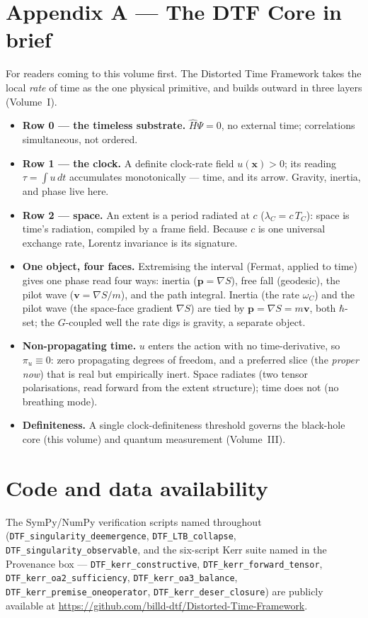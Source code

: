 \documentclass[11pt]{article}
\begin{document}
\appendix
\section*{Appendix A --- The DTF Core in brief}
\noindent For readers coming to this volume first. The Distorted Time Framework takes the local
\emph{rate} of time as the one physical primitive, and builds outward in three layers (Volume~I).
\begin{itemize}[leftmargin=1.4em,itemsep=3pt,topsep=3pt]
  \item \textbf{Row 0 --- the timeless substrate.} $\hat H\Psi=0$, no external time; correlations
    simultaneous, not ordered.
  \item \textbf{Row 1 --- the clock.} A definite clock-rate field $u(\mathbf x)>0$; its reading
    $\tau=\int u\,dt$ accumulates monotonically --- time, and its arrow. Gravity, inertia, and phase live
    here.
  \item \textbf{Row 2 --- space.} An extent is a period radiated at $c$ ($\lambda_C=c\,T_C$): space is
    time's radiation, compiled by a frame field. Because $c$ is one universal exchange rate, Lorentz
    invariance is its signature.
  \item \textbf{One object, four faces.} Extremising the interval (Fermat, applied to time) gives one
    phase read four ways: inertia ($\mathbf p=\nabla S$), free fall (geodesic), the pilot wave
    ($\mathbf v=\nabla S/m$), and the path integral. Inertia (the rate $\omega_C$) and the pilot wave (the
    space-face gradient $\nabla S$) are tied by $\mathbf p=\nabla S=m\mathbf v$, both $\hbar$-set; the
    $G$-coupled well the rate digs is gravity, a separate object.
  \item \textbf{Non-propagating time.} $u$ enters the action with no time-derivative, so $\pi_u\equiv0$:
    zero propagating degrees of freedom, and a preferred slice (the \emph{proper now}) that is real but
    empirically inert. Space radiates (two tensor polarisations, read forward from the extent structure); time does not (no breathing mode).
  \item \textbf{Definiteness.} A single clock-definiteness threshold governs the black-hole core (this
    volume) and quantum measurement (Volume~III).
\end{itemize}

\section*{Code and data availability}
{\small The SymPy/NumPy verification scripts named throughout (\texttt{DTF\_singularity\_deemergence},
\texttt{DTF\_LTB\_collapse}, \texttt{DTF\_singularity\_observable}, and the six-script Kerr suite named in
the Provenance box --- \texttt{DTF\_kerr\_constructive}, \texttt{DTF\_kerr\_forward\_tensor},
\texttt{DTF\_kerr\_oa2\_sufficiency}, \texttt{DTF\_kerr\_oa3\_balance},
\texttt{DTF\_kerr\_premise\_oneoperator}, \texttt{DTF\_kerr\_deser\_closure}) are publicly available at
\url{https://github.com/billd-dtf/Distorted-Time-Framework}.\par}
\end{document}
